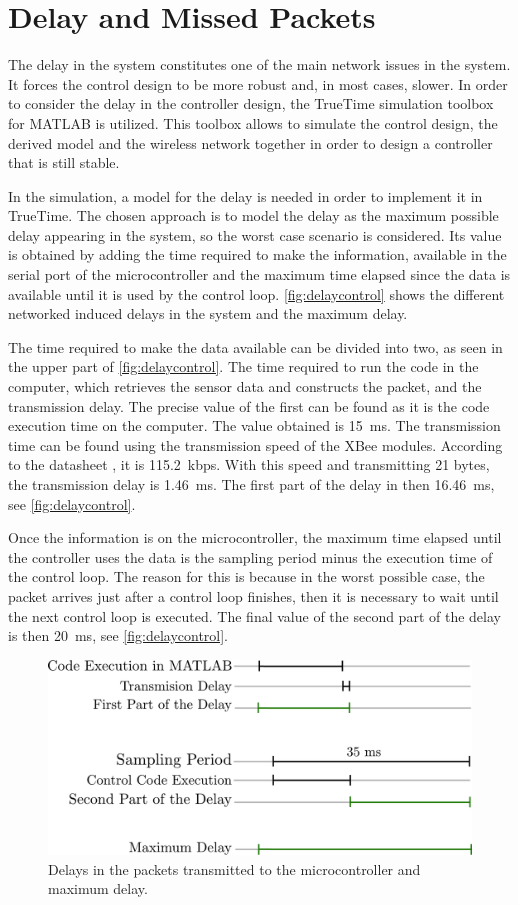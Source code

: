 \section{Delay and Missed Packets}
The delay in the system constitutes one of the main network issues in the system. It forces the control design to be more robust and, in most cases, slower. In order to consider the delay in the controller design, the TrueTime simulation toolbox for MATLAB is utilized. This toolbox allows to simulate the control design, the derived model and the wireless network together in order to design a controller that is still stable.

In the simulation, a model for the delay is needed in order to implement it in TrueTime. The chosen approach is to model the delay as the maximum possible delay appearing in the system, so the worst case scenario is considered. Its value is obtained by adding the time required to make the information, available in the serial port of the microcontroller and the maximum time elapsed since the data is available until it is used by the control loop. \autoref{fig:delaycontrol} shows the different networked induced delays in the system and the maximum delay.  

The time required to make the data available can be divided into two, as seen in the upper part of \autoref{fig:delaycontrol}. The time required to run the code in the computer, which retrieves the sensor data and constructs the packet, and the transmission delay. The precise value of the first can be found as it is the code execution time on the computer. The value obtained is \SI{15}{ms}. The transmission time can be found using the transmission speed of the XBee modules. According to the datasheet \cite{XBee}, it is \SI{115.2}{kbps}. With this speed and transmitting 21 bytes, the transmission delay is \SI{1.46}{ms}. The first part of the delay in then \SI{16.46}{ms}, see \autoref{fig:delaycontrol}.

Once the information is on the microcontroller, the maximum time elapsed until the controller uses the data is the sampling period minus the execution time of the control loop. The reason for this is because in the worst possible case, the packet arrives just after a control loop finishes, then it is necessary to wait until the next control loop is executed. The final value of the second part of the delay is then \SI{20}{ms}, see \autoref{fig:delaycontrol}.
 
\begin{figure}[H]
	\centering
	\includegraphics[width=.6\textwidth]{figures/maxDelay.pdf}
	\caption{Delays in the packets transmitted to the microcontroller and maximum delay.}
	\label{fig:delaycontrol}
\end{figure}


